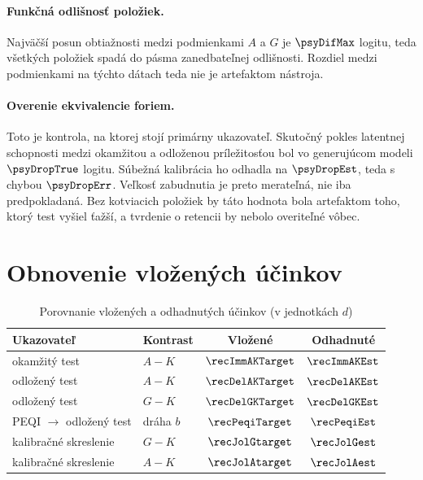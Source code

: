 \paragraph{Funkčná odlišnosť položiek.} Najväčší posun obtiažnosti medzi podmienkami $A$ a $G$ je $\psyDifMax$ logitu, teda všetkých \psyDifNegligible{} položiek spadá do pásma zanedbateľnej odlišnosti. Rozdiel medzi podmienkami na týchto dátach teda nie je artefaktom nástroja.

\paragraph{Overenie ekvivalencie foriem.}
\label{sec:ekvivalencia-overenie}
Toto je kontrola, na ktorej stojí primárny ukazovateľ. Skutočný pokles latentnej schopnosti medzi okamžitou a odloženou príležitosťou bol vo generujúcom modeli $\psyDropTrue$ logitu. Súbežná kalibrácia ho odhadla na $\psyDropEst$, teda s chybou $\psyDropErr$. Veľkosť zabudnutia je preto merateľná, nie iba predpokladaná. Bez kotviacich položiek by táto hodnota bola artefaktom toho, ktorý test vyšiel ťažší, a tvrdenie o retencii by nebolo overiteľné vôbec.

\section{Obnovenie vložených účinkov}

\begin{table}[H]
\centering
\caption{Porovnanie vložených a odhadnutých účinkov (v jednotkách $d$)}
\label{tab:obnovenie}
\small
\begin{tabular}{@{}llcc@{}}
\toprule
\textbf{Ukazovateľ} & \textbf{Kontrast} & \textbf{Vložené} & \textbf{Odhadnuté} \\
\midrule
okamžitý test   & $A-K$ & $\recImmAKTarget$ & $\recImmAKEst$ \\
odložený test   & $A-K$ & $\recDelAKTarget$ & $\recDelAKEst$ \\
odložený test   & $G-K$ & $\recDelGKTarget$ & $\recDelGKEst$ \\
PEQI $\to$ odložený test & dráha $b$ & $\recPeqiTarget$ & $\recPeqiEst$ \\
kalibračné skreslenie & $G-K$ & $\recJolGtarget$ & $\recJolGest$ \\
kalibračné skreslenie & $A-K$ & $\recJolAtarget$ & $\recJolAest$ \\
\bottomrule
\end{tabular}
\end{table}

